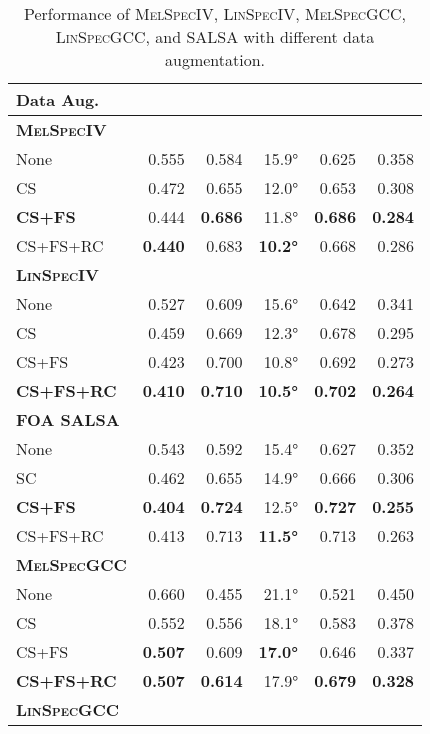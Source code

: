 \documentclass[journal]{IEEEtran}
\begin{document}
\begin{table}[t]
    \setlength\tabcolsep{3pt}
    \centering
    \caption{Performance of \textsc{MelSpecIV}, \textsc{LinSpecIV}, \textsc{MelSpecGCC}, \textsc{LinSpecGCC}, and SALSA with different data augmentation.}
    \noindent\begin{tabularx}{\columnwidth}{Xrrrrr}
    \toprule 
        Data Aug. 
        &  
        & 
        & 
        &  
        &  \\
    \midrule
    \bfseries \textsc{MelSpecIV}\\
        None        & 0.555 & 0.584 & 15.9\si{\degree} & 0.625 & 0.358 \\
        CS          & 0.472 & 0.655 & 12.0\si{\degree} & 0.653 & 0.308 \\
        \bf{CS+FS}  & 0.444 & \bf{0.686} & 11.8\si{\degree} & \bf{0.686} & \bf{0.284} \\
        CS+FS+RC    & \bf{0.440} & 0.683 & \bf{10.2\si{\degree}} & 0.668 & 0.286 \\
    \midrule
    \bfseries \textsc{LinSpecIV}\\
        None            & 0.527 & 0.609 & 15.6\si{\degree} & 0.642 & 0.341 \\
        CS              & 0.459 & 0.669 & 12.3\si{\degree} & 0.678 & 0.295 \\
        CS+FS           & 0.423 & 0.700 & 10.8\si{\degree} & 0.692 & 0.273 \\
        \bf{CS+FS+RC}   & \bf{0.410} & \bf{0.710} & \bf{10.5\si{\degree}} & \bf{0.702} & \bf{0.264} \\
    \midrule
    \bfseries FOA SALSA\\
    
        None            & 0.543 & 0.592 & 15.4\si{\degree} & 0.627 & 0.352 \\
        SC              & 0.462 & 0.655 & 14.9\si{\degree} & 0.666 & 0.306 \\
        \bf{CS+FS}      & \bf{0.404} & \bf{0.724} & 12.5\si{\degree} & \bf{0.727} & \bf{0.255} \\
        CS+FS+RC        & 0.413 & 0.713 & \bf{11.5\si{\degree}} & 0.713 & 0.263 \\
    \midrule\midrule
    \bfseries \textsc{MelSpecGCC}\\
    
        None            & 0.660 & 0.455 & 21.1\si{\degree} & 0.521 & 0.450 \\
        CS              & 0.552 & 0.556 & 18.1\si{\degree} & 0.583 & 0.378 \\
        CS+FS           & \bf{0.507} & 0.609 & \bf{17.0\si{\degree}} & 0.646 & 0.337 \\
        \bf{CS+FS+RC}   & \bf{0.507} & \bf{0.614} & 17.9\si{\degree} & \bf{0.679} & \bf{0.328} \\
    \midrule
    \bfseries \textsc{LinSpecGCC}\\
    

\end{tabularx}
\end{table}
\end{document}
